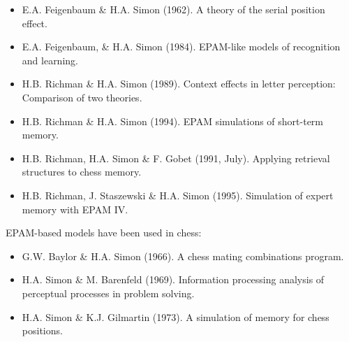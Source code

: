 \documentclass{article}
\begin{document}
\begin{itemize}
\item E.A. Feigenbaum \& H.A. Simon (1962). A theory of the serial position
effect.~\cite{Feigenbaum62}
\item E.A. Feigenbaum, \& H.A. Simon (1984). EPAM-like models of recognition 
and learning.~\cite{Feigenbaum84}
\item H.B. Richman \& H.A. Simon (1989). Context effects in letter
perception: Comparison of two theories.~\cite{Richman89}
\item H.B. Richman \& H.A. Simon (1994). EPAM simulations of short-term
memory.~\cite{Richman94} 
\item H.B. Richman, H.A. Simon \& F. Gobet (1991, July).
Applying retrieval structures to chess memory.~\cite{Richman91}
\item H.B. Richman, J. Staszewski \& H.A. Simon (1995). Simulation of expert memory with EPAM IV.~\cite{Richman95}
\end{itemize}

\noindent EPAM-based models have been used in chess:

\begin{itemize}
\item G.W. Baylor \& H.A. Simon (1966). A chess mating combinations program.~\cite{Baylor66}
\item H.A. Simon \& M. Barenfeld (1969). Information processing analysis of perceptual processes in problem solving.\cite{Simon69b}
\item H.A. Simon \& K.J. Gilmartin (1973). A simulation of memory for 
chess positions.~\cite{Simon73}
\end{itemize}






\end{document}
